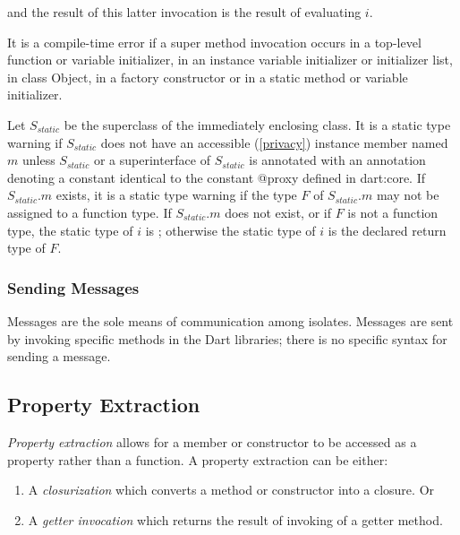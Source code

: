 \documentclass{article}
\newcommand{\code}[1]{{\sf #1}}
\begin{document}
and the result of this latter invocation is the result of evaluating $i$.


\LMHash{}
It is a compile-time error if a super method invocation occurs in a top-level function or variable initializer, in an instance variable initializer or initializer list, in class \code{Object}, in a factory constructor or in a static method or variable initializer.

\LMHash{}
Let $S_{static}$ be the superclass of the immediately enclosing class. It is a static type warning if $S_{static}$ does not have an accessible (\ref{privacy}) instance member named $m$ unless $S_{static}$ or a superinterface of $S_{static}$ is annotated with an annotation denoting a constant identical to the constant \code{@proxy} defined in \code{dart:core}. If $S_{static}.m$ exists, it  is a static type warning if the type $F$ of $S_{static}.m$ may not be assigned to a function type. If $S_{static}.m$ does not exist, or if $F$ is not a function type, the static type of $i$ is \DYNAMIC{}; otherwise the static type of $i$ is the declared return type of  $F$.  




\subsubsection{Sending Messages}

\LMHash{}
Messages are the sole means of communication among isolates. Messages are sent by invoking specific  methods in the Dart libraries; there is no specific syntax for sending a message. 




\subsection{ Property Extraction}

\LMHash{}
{\em Property extraction} allows for a member or constructor to be accessed as a property rather than a function.
A property extraction can be either:
\begin{enumerate}
\item A {\em closurization} which converts a method or constructor into a closure. Or
\item A {\em getter invocation} which returns the result of invoking of a getter method.
\end{enumerate}
\end{document}
